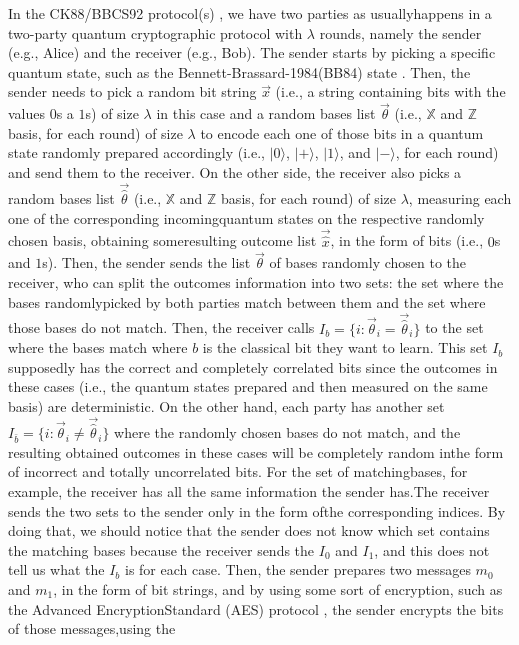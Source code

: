 \documentclass[12pt]{article}
\begin{document}
    In the CK88/BBCS92 protocol(s) \cite{crepeau-kilian:achieving-oblivious-transfer-using-weakened-security-assumptions:1988:03-2024,crepeau-kilian:weakening-security-assumptions-and-oblivious-transfer:1988:03-2024,bennett-brassard-crepeau-skubiszewska:practical-quantum-oblivious-transfer:1992-03-2024}, we have two parties as usually\break happens in a two-party quantum cryptographic protocol with $\lambda$ rounds, namely the sender (e.g., Alice) and the receiver (e.g., Bob). The sender starts by picking a specific quantum state, such as the Bennett-Brassard-1984\break (BB84) state \cite{bennett-brassard:quantum-cryptography-public-key-distribution-coin-tossing:1984:03-2024,bennett-brassard:quantum-cryptography-public-key-distribution-coin-tossing:2014:03-2024}. Then, the sender needs to pick a random bit string $\vec{x}$ (i.e., a string containing bits with the values $0$s a $1$s) of size $\lambda$ in this case and a random bases list $\vec{\theta}$ (i.e., $\mathbb{X}$ and $\mathbb{Z}$ basis, for each round) of size $\lambda$ to encode each one of those bits in a quantum state randomly prepared accordingly (i.e., $|0\rangle$, $|+\rangle$, $|1\rangle$, and $|-\rangle$, for each round) and send them to the receiver. On the other side, the receiver also picks a random bases list $\vec{\hat{\theta}}$ (i.e., $\mathbb{X}$ and $\mathbb{Z}$ basis, for each round) of size $\lambda$, measuring each one of the corresponding incoming\break quantum states on the respective randomly chosen basis, obtaining some\break resulting outcome list $\vec{\hat{x}}$, in the form of bits (i.e., $0$s and $1$s). Then, the sender sends the list $\vec{\theta}$ of bases randomly chosen to the receiver, who can split the outcomes information into two sets: the set where the bases randomly\break picked by both parties match between them and the set where those bases do not match. Then, the receiver calls ${I}_{b} = \{ i: {\vec{{\theta}}}_{i} = {\vec{\hat{\theta}}}_{i} \}$ to the set where the bases match where $b$ is the classical bit they want to learn. This set ${I}_{b}$\break supposedly has the correct and completely correlated bits since the outcomes in these cases (i.e., the quantum states prepared and then measured on the same basis) are deterministic. On the other hand, each party has another set\break ${I}_{\bar{b}} = \{ i: {\vec{{\theta}}}_{i} \neq {\vec{\hat{\theta}}}_{i} \}$ where the randomly chosen bases do not match, and the resulting obtained outcomes in these cases will be completely random in\break the form of incorrect and totally uncorrelated bits. For the set of matching\break bases, for example, the receiver has all the same information the sender has.\break The receiver sends the two sets to the sender only in the form of\break the corresponding indices. By doing that, we should notice that the sender does not know which set contains the matching bases because the receiver sends the ${I}_{0}$ and ${I}_{1}$, and this does not tell us what the ${I}_{b}$ is for each case. Then, the sender prepares two messages ${m}_{0}$ and ${m}_{1}$, in the form of bit strings, and by using some sort of encryption, such as the Advanced Encryption\break Standard (AES) protocol \cite{rijmen-daemen:advanced-encryption-standard:2001:02-2024}, the sender encrypts the bits of those messages,\break using the 
\end{document}
